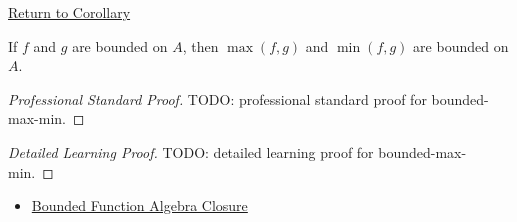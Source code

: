 \newpage
{}
\label{prf:bounded-max-min}

\begin{remark*}[Return]
\hyperref[cor:bounded-max-min]{Return to Corollary}
\end{remark*}

\begin{corollary*}
If \(f\) and \(g\) are bounded on \(A\), then \(\max(f,g)\) and
\(\min(f,g)\) are bounded on \(A\).
\end{corollary*}

\begin{proof}[Professional Standard Proof]
\LRAProofBodyStart
TODO: professional standard proof for bounded-max-min.
\end{proof}

\begin{proof}[Detailed Learning Proof]
\LRAProofBodyStart
TODO: detailed learning proof for bounded-max-min.
\end{proof}

\begin{remark*}
\end{remark*}

\begin{dependencies}
\begin{itemize}
  \item \hyperref[thm:bounded-function-algebra-closure]{Bounded Function Algebra Closure}
\end{itemize}
\end{dependencies}

\clearpage
